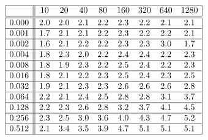 \[
\begin{array}{|c||cccccccc|}
\hline 
& 10 & 20 & 40 & 80 & 160 & 320 & 640 & 1280\\
\hline \hline 
0.000 & 2.0 & 2.0 & 2.1 & 2.2 & 2.3 & 2.2 & 2.1 & 2.1 \\ \hline 
0.001 & 1.7 & 2.1 & 2.1 & 2.2 & 2.3 & 2.2 & 2.2 & 2.1 \\ \hline 
0.002 & 1.6 & 2.1 & 2.2 & 2.2 & 2.3 & 2.3 & 3.0 & 1.7 \\ \hline 
0.004 & 1.8 & 2.3 & 2.0 & 2.2 & 2.4 & 2.4 & 2.2 & 2.3 \\ \hline 
0.008 & 1.8 & 1.9 & 2.3 & 2.2 & 2.5 & 2.4 & 2.2 & 2.3 \\ \hline 
0.016 & 1.8 & 2.1 & 2.2 & 2.3 & 2.5 & 2.4 & 2.3 & 2.5 \\ \hline 
0.032 & 1.9 & 2.1 & 2.3 & 2.3 & 2.6 & 2.6 & 2.6 & 2.8 \\ \hline 
0.064 & 2.2 & 2.1 & 2.4 & 2.5 & 2.8 & 2.8 & 3.1 & 3.7 \\ \hline 
0.128 & 2.2 & 2.3 & 2.6 & 2.8 & 3.2 & 3.7 & 4.1 & 4.5 \\ \hline 
0.256 & 2.3 & 2.5 & 3.0 & 3.6 & 4.0 & 4.3 & 4.7 & 5.2 \\ \hline 
0.512 & 2.1 & 3.4 & 3.5 & 3.9 & 4.7 & 5.1 & 5.1 & 5.1 \\ \hline 
\end{array}
\]


